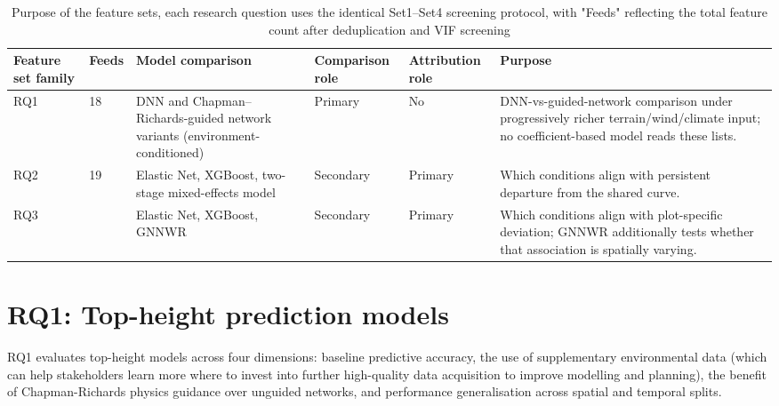 \documentclass[11pt,a4paper]{report}
\begin{document}
\begin{table}[!htbp]
\centering
\scriptsize
\renewcommand{\arraystretch}{1.2}
\begin{tabular}{p{2.1cm}p{0.8cm}p{3.4cm}p{1.5cm}p{1.4cm}p{3.1cm}}
\toprule
Feature set family & Feeds & Model comparison & Comparison role & Attribution role & Purpose \\
\midrule
RQ1 & 18 & DNN and Chapman--Richards-guided network variants (environment-conditioned) & Primary &
No & DNN-vs-guided-network comparison under progressively richer terrain/wind/climate input; no
coefficient-based model reads these lists. \\
RQ2 & 19 & Elastic Net, XGBoost, two-stage mixed-effects model & Secondary & Primary & Which
conditions align with persistent departure from the shared curve. \\
RQ3 & \ct{RQ3's Set4 total column count -- pull from the actual feature manifest, don't guess} &
Elastic Net, XGBoost, GNNWR & Secondary & Primary & Which conditions align with
plot-specific deviation; GNNWR additionally tests whether that association is spatially
varying. \\
\bottomrule
\end{tabular}
\caption{Purpose of the feature sets, each research question uses the identical Set1--Set4 screening protocol, with "Feeds" reflecting the total feature count after deduplication and VIF screening}
\label{tab:feature-set-purpose}
\end{table}

\section{RQ1: Top-height prediction models}
\label{sec:rq1-models}

RQ1 evaluates top-height models across four dimensions: baseline predictive accuracy, the use of supplementary environmental data (which can help stakeholders learn more where to invest into further high-quality data acquisition to improve modelling and planning), the benefit of Chapman-Richards physics guidance over unguided networks, and performance generalisation across spatial and temporal splits.
\end{document}
